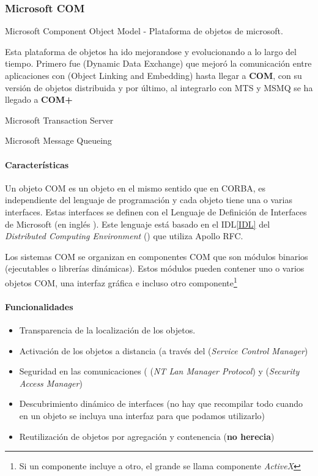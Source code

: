 \subsubsection{Microsoft COM}

\begin{defn}
	Microsoft Component Object Model - Plataforma de objetos de microsoft.
\end{defn}

Esta plataforma de objetos ha ido mejorandose y evolucionando a lo largo del tiempo. Primero fue  (Dynamic Data Exchange) que mejoró la comunicación entre aplicaciones con  (Object Linking and Embedding) hasta llegar a \textbf{COM}, con su versión de objetos distribuida  y por último, al integrarlo con MTS y MSMQ se ha llegado a \textbf{COM+}

\begin{defn}[MTS]
	Microsoft Transaction Server
\end{defn}

\begin{defn}[MSMQ]
	Microsoft Message Queueing
\end{defn}

\paragraph{Características}
Un objeto COM es un objeto en el mismo sentido que en CORBA,  es independiente del lenguaje de programación y cada objeto tiene una o varias interfaces. Estas interfaces se definen con el Lenguaje de Definición de Interfaces de Microsoft (en inglés ). Este lenguaje está basado en el IDL\ref{IDL} del \textit{Distributed Computing Environment} () que utiliza Apollo RFC.

Los sistemas COM se organizan en componentes COM que son módulos binarios (ejecutables o librerías dinámicas). Estos módulos pueden contener uno o varios objetos COM, una interfaz gráfica e incluso otro componente\footnote{Si un componente incluye a otro, el grande se llama componente \textit{ActiveX}}

\paragraph{Funcionalidades}

\begin{itemize}
	\item Transparencia de la localización de los objetos.
	\item Activación de los objetos a distancia (a través del  (\textit{Service Control Manager})
	\item Seguridad en las comunicaciones ( (\textit{NT Lan Manager Protocol}) y  (\textit{Security Access Manager})
	\item Descubrimiento dinámico de interfaces (no hay que recompilar todo cuando en un objeto se incluya una interfaz para que podamos utilizarlo)
	\item Reutilización de objetos por agregación y contenencia (\textbf{no herecia})
\end{itemize}


